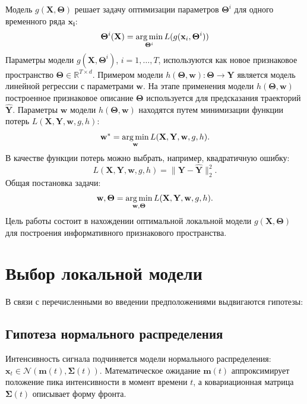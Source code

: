 \documentclass[12pt,twoside]{article}
\begin{document}
Модель $g(\mathbf{X}, \mathbf{\Theta})$ решает задачу оптимизации параметров $\mathbf{\Theta}^{i}$ для одного временного ряда $\mathbf{x_{i}}$:
\begin{equation}
\mathbf{\Theta}^i(\mathbf{X}) = \argmin_{\mathbf{\Theta}^i} L(g(\mathbf{x}_i, \mathbf{\Theta}^i))
\end{equation}
Параметры модели $g(\mathbf{X}, \mathbf{\Theta}^i)$, $i = 1,\dots,T$, используются как новое признаковое пространство $\mathbf{\Theta}\in\mathbb{R}^{T\times d}$.
Примером модели $h(\mathbf{\Theta}, \mathbf{w}): \mathbf{\Theta}\to\mathbf{Y}$ является модель линейной регрессии с параметрами $\mathbf{w}$. На этапе применения модели $h(\mathbf{\Theta}, \mathbf{w})$ построенное признаковое описание $\mathbf{\Theta}$ используется для предсказания траекторий $\mathbf{\hat{Y}}$.
Параметры $\mathbf{w}$ модели $h(\mathbf{\Theta}, \mathbf{w})$ находятся путем минимизации функции потерь $L(\mathbf{X}, \mathbf{Y}, \mathbf{w}, g, h)$:
\begin{equation}
\mathbf{w^*} = \argmin_{\mathbf{w}} L(\mathbf{X}, \mathbf{Y}, \mathbf{w}, g, h).
\end{equation}
В качестве функции потерь можно выбрать, например, квадратичную ошибку:
\begin{equation}
L(\mathbf{X}, \mathbf{Y}, \mathbf{w}, g, h) = \|\mathbf{Y}-\mathbf{\hat{Y}}\|^2_2.
\end{equation}
Общая постановка задачи:
\begin{equation}
\mathbf{w}, \mathbf{\Theta} = \argmin_{\mathbf{w}, \mathbf{\Theta}} L(\mathbf{X}, \mathbf{Y}, \mathbf{w}, g, h).
\end{equation}
Цель работы состоит в нахождении оптимальной локальной модели $g(\mathbf{X}, \mathbf{\Theta})$ для построения информативного признакового пространства.

\section{Выбор локальной модели}
В связи с перечисленными во введении предположениями выдвигаются гипотезы: 

\subsection{Гипотеза нормального распределения}
Интенсивность сигнала подчиняется модели нормального распределения: $\mathbf{x}_t \in \mathcal{N}(\mathbf{m}(t),\mathbf{\Sigma}(t))$. Математическое ожидание $\mathbf{m}(t)$ аппроксимирует положение пика интенсивности в момент времени $t$, а ковариационная матрица $\mathbf{\Sigma}(t)$ описывает форму фронта. 
\end{document}
